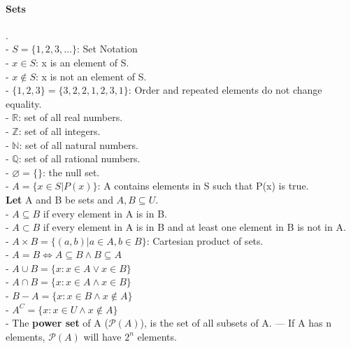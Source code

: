 \documentclass[10pt,letterpaper]{article}
\begin{document}
\begin{multicols}{2}

\paragraph*{Sets}.\\
- $S = \{1,2,3,\dots\}$: Set Notation\\
- $x \in S$: x is an element of S.\\
- $x \notin S$: x is not an element of S.\\
- $\{1,2,3\}=\{3,2,2,1,2,3,1\}$: Order and repeated elements do not change equality.\\
- $\mathbb{R}$: set of all real numbers.\\
- $\mathbb{Z}$: set of all integers.\\
- $\mathbb{N}$: set of all natural numbers.\\
- $\mathbb{Q}$: set of all rational numbers.\\
- $\varnothing = \{\}$: the null set.\\
- $A = \{x \in S | P(x)\}$: A contains elements in S such that P(x) is true.\\
\textbf{Let} A and B be sets and $A,B \subseteq U$.\\
- $A \subseteq B$ if every element in A is in B.\\
- $A \subset B$ if every element in A is in B and at least one element in B is not in A.\\
- $A \times B = \{(a,b) | a \in A, b \in B\}$: Cartesian product of sets.\\
- $A = B \iff A \subseteq B \land B \subseteq A$\\
- $A \cup B = \{x : x \in A \lor x \in B\}$\\
- $A \cap B = \{x : x \in A \land x \in B\}$\\
- $B - A = \{x : x \in B \land x \notin A\}$\\
- $A^C = \{x : x \in U \land x \notin A\}$\\
- The \textbf{power set} of A ($\mathcal{P}(A)$), is the set of all subsets of A. 
--- If A has n elements, $\mathcal{P}(A)$ will have $2^n$ elements.


\end{multicols}
\end{document}
